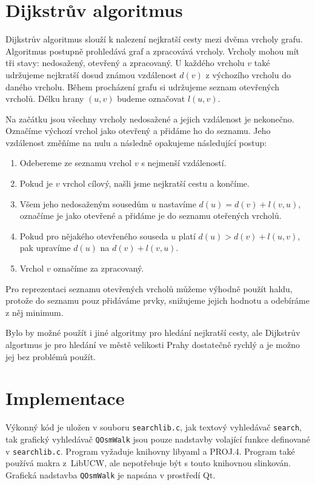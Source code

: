 \section{Dijkstrův algoritmus}
Dijkstrův algoritmus \cite{dijkstra} slouží k nalezení nejkratší cesty mezi dvěma vrcholy grafu.
Algoritmus postupně prohledává graf a zpracovává vrcholy. Vrcholy mohou mít tři
stavy: nedosažený, otevřený a zpracovaný. U každého vrcholu $v$ také udržujeme
nejkratší dosud známou vzdálenost $d(v)$ z výchozího vrcholu do daného vrcholu. 
Během procházení grafu si udržujeme seznam otevřených vrcholů. Délku hrany
$(u,v)$ budeme označovat $l(u,v)$.

Na začátku jsou všechny vrcholy nedosažené a jejich vzdálenost je nekonečno.
Označíme výchozí vrchol jako otevřený a přidáme ho do seznamu. Jeho vzdálenost
změňíme na nulu a následně opakujeme následující postup:
\begin{enumerate}
	\item Odebereme ze seznamu vrchol $v$ s nejmenší vzdáleností. 
	\item Pokud je $v$ vrchol cílový, našli jsme nejkratší cestu a končíme.
	\item Všem jeho nedosaženým sousedům $u$ nastavíme $d(u)=d(v)+l(v,u)$,
	označíme je jako otevřené a přidáme je do seznamu oteřených vrcholů.
	\item Pokud pro nějakého otevřeného souseda $u$ platí $d(u) >
	d(v)+l(u,v)$, pak upravíme $d(u)$ na $d(v)+l(v,u)$.
	\item Vrchol $v$ označíme za zpracovaný.
\end{enumerate}
Pro reprezentaci seznamu otevřených vrcholů můžeme výhodně použít haldu, protože
do seznamu pouz přidáváme prvky, snižujeme jejich hodnotu a odebíráme z něj
minimum.

Bylo by možné použít i jiné algoritmy pro hledání nejkratší cesty, ale Dijkstrův
algortmus je pro hledání ve městě velikosti Prahy dostatečně rychlý a je možno
jej bez problémů použít.


\section{Implementace}
Výkonný kód je uložen v souboru \verb|searchlib.c|, jak textový vyhledávač
\verb|search|, tak grafický vyhledávač \verb|QOsmWalk| jsou pouze nadstavby
volající funkce definované v \verb|searchlib.c|. Program vyžaduje knihovny {\tuc libyaml} a
{\tuc PROJ.4}. Program také používá makra z~{\tuc LibUCW}, ale nepotřebuje být s touto
knihovnou slinkován. Grafická nadstavba \verb|QOsmWalk| je napsána v prostředí
Qt.

